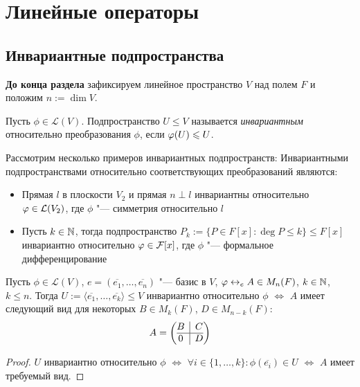 \section{Линейные операторы}

\subsection{Инвариантные подпространства}

\textbf{До конца раздела} зафиксируем линейное пространство $V$ над полем $F$ и положим $n := \dim{V}$.

\begin{definition}
	Пусть $\phi \in \mathcal{L}(V)$. Подпространство $U \le V$ называется \textit{инвариантным} относительно преобразования $\phi$, если $\phi(U) \hm{\le} U$.
\end{definition}

\begin{example}
	Рассмотрим несколько примеров инвариантных подпространств:
	Инвариантными подпространствами относительно соответствующих преобразований являются:
	\begin{itemize}
		\item Прямая $l$ в плоскости $V_2$ и прямая $n \perp l$ инвариантны относительно $\varphi \in \mathcal L(V_2)$, где $\phi$ "--- симметрия относительно $l$
		\item Пусть $k \in \mathbb{N}$, тогда подпространство $P_k := \{P \in F[x]: \deg P \le k\} \le F[x]$ инвариантно относительно $\varphi \in \mathcal F[x]$, где $\phi$ "--- формальное дифференцирование
	\end{itemize}
\end{example}

\begin{proposition}
	Пусть $\phi \in \mathcal{L}(V)$, $e = (\overline{e_1}, \dots, \overline{e_n})$ "--- базис в $V$, $\phi \leftrightarrow_e A \hm{\in} M_n(F)$, $k \in \mathbb{N}$, $k \le n$. Тогда $U := \langle\overline{e_1}, \dots, \overline{e_k}\rangle \le V$ инвариантно относительно $\phi$ $\Leftrightarrow$ $A$ имеет следующий вид для некоторых $B \in M_k(F)$, $D \in M_{n - k}(F)$:
	\[A = \left(\begin{array}{@{}c|c@{}}
	B & C\\
	\hline
	0 & D
	\end{array}\right)\]
\end{proposition}

\begin{proof}
	$U$ инвариантно относительно $\phi$ $\Leftrightarrow$ $\forall i \in \{1, \dots, k\}: \phi(\overline{e_i}) \in U$ $\Leftrightarrow$ $A$ имеет требуемый вид.
\end{proof}

